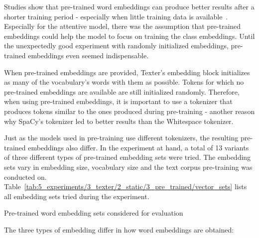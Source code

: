 Studies show that pre-trained word embeddings can produce better results after a shorter training period - especially when little training data is available~\cite{}. Especially for the attentive model, there was the assumption that pre-trained embeddings could help the model to focus on training the class embeddings. Until the unexpectedly good experiment with randomly initialized embeddings, pre-trained embeddings even seemed indispensable.

When pre-trained embeddings are provided, Texter's embedding block initializes as many of the vocabulary's words with them as possible. Tokens for which no pre-trained embeddings are available are still initialized randomly. Therefore, when using pre-trained embeddings, it is important to use a tokenizer that produces tokens similar to the ones produced during pre-training - another reason why SpaCy's tokenizer led to better results than the Whitespace tokenizer.

Just as the models used in pre-training use different tokenizers, the resulting pre-trained embeddings also differ. In the experiment at hand, a total of 13 variants of three different types of pre-trained embedding sets were tried. The embedding sets vary in embedding size, vocabulary size and the text corpus pre-training was conducted on. Table~\ref{tab:5_experiments/3_texter/2_static/3_pre_trained/vector_sets} lists all embedding sets tried during the experiment.

\begin{table}[t]
    \centering
    
    \caption{Pre-trained word embedding sets considered for evaluation}
    \label{tab:5_experiments/3_texter/2_static/3_pre_trained/vector_sets}
\end{table}

The three types of embedding differ in how word embeddings are obtained:

